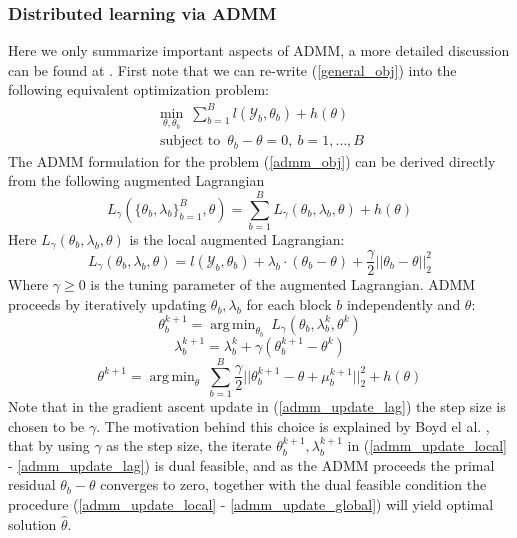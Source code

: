 \documentclass{article}
\DeclareMathOperator*{\argmin}{arg\,min}
\DeclareMathOperator*{\st}{subject~to}
\newcommand{\1}[0]{\ensuremath{\boldsymbol{1}}\xspace}
\begin{document}
\subsubsection{Distributed learning via ADMM}\label{ADMM}
Here we only summarize important aspects of ADMM, a more detailed discussion can be found at \cite{Boyd10}. First note that we can re-write (\ref{general_obj}) into the following equivalent optimization problem:
\begin{equation}\label{admm_obj}
\begin{gathered}
\min_{\theta, \theta_b} ~ \textstyle\sum_{b=1}^Bl(\mathcal{Y}_b,\theta_b) + h(\theta)\\
\st ~ \theta_b - \theta = 0, ~ b = 1,\ldots,B
\end{gathered}
\end{equation}
The ADMM formulation for the problem (\ref{admm_obj}) can be derived directly from the following augmented Lagrangian
\begin{equation}\label{admm_lag_global}
L_\gamma(\{\theta_b, \lambda_b\}_{b=1}^B, \theta) =  \textstyle\sum_{b=1}^BL_\gamma(\theta_b, \lambda_b, \theta) + h(\theta)
\end{equation}
Here $L_\gamma(\theta_b, \lambda_b, \theta)$ is the local augmented Lagrangian:
\begin{equation}\label{admm_lag_local}
L_\gamma(\theta_b, \lambda_b, \theta)  = l(\mathcal{Y}_b, \theta_b) + \lambda_b\cdot(\theta_b - \theta) + \frac{\gamma}{2}||\theta_b - \theta||_2^2
\end{equation}
Where $\gamma \ge 0$ is the tuning parameter of the augmented Lagrangian. ADMM proceeds by iteratively updating $\theta_b, \lambda_b$ for each block $b$ independently and $\theta$:
\begin{equation}\label{admm_update_local}
\theta_b^{k+1} = \argmin_{\theta_b}~L_\gamma(\theta_b, \lambda_b^k, \theta^k)
\end{equation}
\begin{equation}\label{admm_update_lag}
\lambda_b^{k+1} = \lambda_b^k + \gamma(\theta_b^{k+1} - \theta^{k})
\end{equation}
\begin{equation}\label{admm_update_global}
\theta^{k+1} = \argmin_\theta ~\textstyle\sum_{b=1}^B\frac{\gamma}{2}||\theta_b^{k+1} - \theta + \mu_b^{k+1}||^2_2 + h(\theta)
\end{equation}
Note that in the gradient ascent update in (\ref{admm_update_lag}) the step size is chosen to be $\gamma$. The motivation behind this choice is explained by Boyd el al. , that by using $\gamma$ as the step size, the iterate
$\theta_b^{k+1}, \lambda_b^{k+1}$ in (\ref{admm_update_local} - \ref{admm_update_lag}) is dual feasible, and as the ADMM proceeds the primal residual $\theta_b -\theta$ converges to zero, together with the dual feasible condition the procedure (\ref{admm_update_local} - \ref{admm_update_global}) will yield optimal solution $\hat\theta$. 
\end{document}
